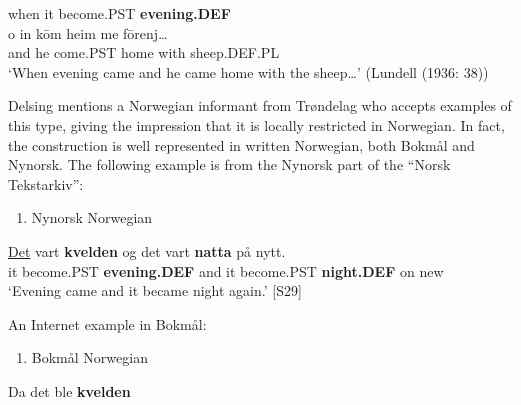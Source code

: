 when  it  become.PST  \textbf{evening.DEF}\\ %


\ea\label{}
\gll o  in  k\=om  heim  me  f\=orenj…\\


and  he  come.PST  home  with  sheep.DEF.PL\\ %


‘When evening came and he came home with the sheep…’ (Lundell (1936: 38))
\z

Delsing mentions a Norwegian informant from Trøndelag who accepts examples of this type, giving the impression that it is locally restricted in Norwegian. In fact, the construction is well represented in written Norwegian, both Bokmål and Nynorsk. The following example is from the Nynorsk part of the “Norsk Tekstarkiv”: 

\begin{enumerate} %
\item 
Nynorsk Norwegian

\end{enumerate} %
\ea\label{}
\gll \href{http://kh.hd.uib.no/cgi-dos/roman-nn.bat?P3C383000#here}{Det}  vart  \textbf{kvelden} og  det  vart  \textbf{natta} på  nytt.\\


it  become.PST  \textbf{evening.DEF} and  it  become.PST  \textbf{night.DEF} on  new\\ %


‘Evening came and it became night again.’ [S29]
\z

An Internet example in Bokmål: 


\begin{enumerate} %
\item 
Bokmål Norwegian

\end{enumerate} %
\ea\label{}
\gll Da  det  ble  \textbf{kvelden} \\


